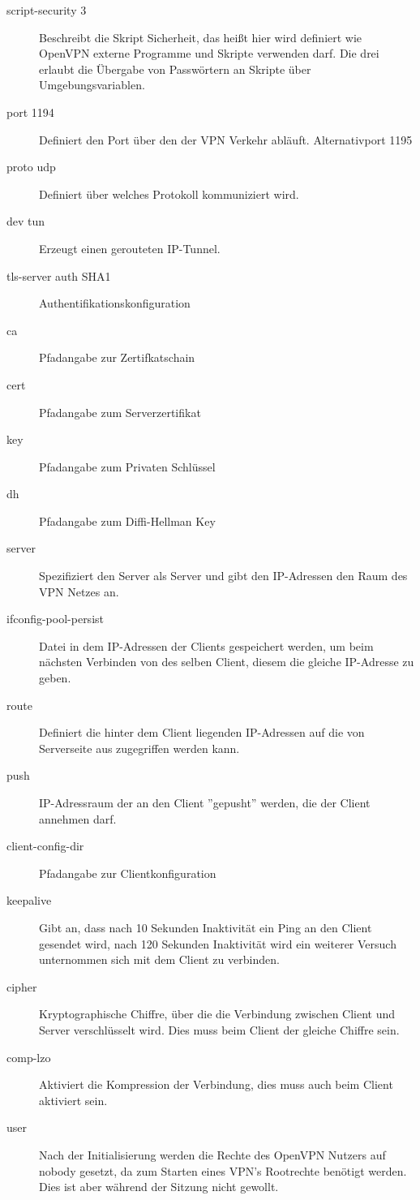 \begin{description}
	\item[script-security 3]
	Beschreibt die Skript Sicherheit, das heißt hier wird definiert wie OpenVPN externe Programme und Skripte verwenden darf. Die drei  erlaubt die Übergabe von Passwörtern an Skripte über Umgebungsvariablen.
	\item[port 1194] Definiert den Port über den der VPN Verkehr abläuft. Alternativport 1195
	\item[proto udp] Definiert über welches Protokoll kommuniziert wird. 
	\item[dev tun] Erzeugt einen gerouteten IP-Tunnel.
	\item[tls-server auth SHA1] Authentifikationskonfiguration
	\item[ca] Pfadangabe zur Zertifkatschain
	\item[cert] Pfadangabe zum Serverzertifikat 
	\item[key] Pfadangabe zum Privaten Schlüssel
	\item[dh] Pfadangabe zum Diffi-Hellman Key 
	\item[server] Spezifiziert den Server als Server und gibt den IP-Adressen den Raum des VPN Netzes an.	
	\item[ifconfig-pool-persist] Datei in dem IP-Adressen der Clients gespeichert werden, um beim nächsten Verbinden von des selben Client, diesem die gleiche IP-Adresse zu geben. 
	\item[route] Definiert die hinter dem Client liegenden IP-Adressen auf die von Serverseite aus zugegriffen werden kann.
	\item[push] IP-Adressraum der an den Client ''gepusht'' werden, die der Client annehmen darf. 
	\item[client-config-dir] Pfadangabe zur Clientkonfiguration
	\item[keepalive] Gibt an, dass nach 10 Sekunden Inaktivität ein Ping an den Client gesendet wird, nach 120 Sekunden Inaktivität wird ein weiterer Versuch unternommen sich mit dem Client zu verbinden.
	\item[cipher] Kryptographische Chiffre, über die die Verbindung zwischen Client und Server verschlüsselt wird. Dies muss beim Client der gleiche Chiffre sein.
	\item[comp-lzo] Aktiviert die Kompression der Verbindung, dies muss auch beim Client aktiviert sein.
	\item[user] Nach der Initialisierung werden die Rechte des OpenVPN Nutzers auf nobody gesetzt, da zum Starten eines VPN's Rootrechte benötigt werden. Dies ist aber während der Sitzung nicht gewollt.

\end{description}
